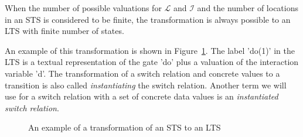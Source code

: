 \begin{comment}
These relations are constructed as follows: for a switch relation $r$ from location $A$ to location $B$, a valuation of the location variables $\nu_l$ and interaction variables $\nu_i$, $\mu_l:(A,\nu_l)$ maps to a state $q$, where $q$ is the source state of a transition $t$, if the result of the valuation $\nu:(\phi$ of $r, \nu_l \cup \nu_i)$ is true. $\nu_{l_new}$ is the new valuation of the location variables constructed by the valuation of $\rho$ of $r$. Then, the target state $q'$ of $t$ is the state mapped by $\mu_l:(B,\nu_{l_new}$). The label of $t$ is a textual representation of $\lambda$ of $r$ and $\nu_i$. Applying this rule for the topology to all locations, switch relations and concrete values for the variables, results in $L$. The start state $q0$ of $L$ is the state mapped by $\mu_l:(l_0,\imath)$. All states not reachable from $q0$ are removed from $L$.
\end{comment}

When the number of possible valuations for $\mathcal{L}$ and $\mathcal{I}$ and the number of locations in an STS is considered to be finite, the transformation is always possible to an LTS with finite number of states.

An example of this transformation is shown in Figure~\ref{fig:example_trafo}. The label 'do(1)' in the LTS is a textual representation of the gate 'do' plus a valuation of the interaction variable 'd'. The transformation of a switch relation and concrete values to a transition is also called \textit{instantiating} the switch relation. Another term we will use for a switch relation with a set of concrete data values is an \textit{instantiated switch relation}.

\begin{figure}[ht]
  \begin{center}
    \hspace{20px}
  \end{center}
  \caption{An example of a transformation of an STS to an LTS}
  \label{fig:example_trafo}
\end{figure}

